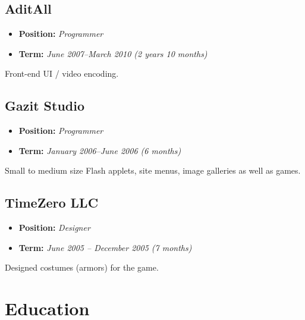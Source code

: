 \documentclass[oneside]{memoir}
\begin{document}
\section{AditAll}
\label{sec-3-6}
\begin{itemize}
\item \textbf{Position:} \emph{Programmer}
\item \textbf{Term:} \emph{June 2007--March 2010 (2 years 10 months)}
\end{itemize}

Front-end UI / video encoding.
\section{Gazit Studio}
\label{sec-3-7}
\begin{itemize}
\item \textbf{Position:} \emph{Programmer}
\item \textbf{Term:} \emph{January 2006--June 2006 (6 months)}
\end{itemize}

Small to medium size Flash applets, site menus, image galleries as well as games.
\section{TimeZero LLC}
\label{sec-3-8}
\begin{itemize}
\item \textbf{Position:} \emph{Designer}
\item \textbf{Term:} \emph{June 2005 – December 2005 (7 months)}
\end{itemize}

Designed costumes (armors) for the game.
\chapter{Education}
\label{sec-4}
\end{document}
